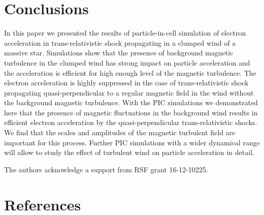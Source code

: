 \documentclass[a4paper]{jpconf}
\begin{document}
\section{Conclusions}
In this paper we presented the results of particle-in-cell simulation of electron acceleration in trans-relativistic shock propagating in a clumped  wind of a massive star. Simulations show that the presence  of background  magnetic turbulence in the clumped wind has strong impact on particle acceleration and the acceleration is efficient for high enough level of the magnetic turbulence. The electron acceleration is highly suppressed in the case of  trans-relativistic shock propagating quasi-perpendicular to a regular magnetic field in the wind without the background magnetic turbulence. With the PIC simulations we demonstrated here that the presence of magnetic fluctuations in the background wind results in efficient electron acceleration by the quasi-perpendicular trans-relativistic shocks. We find that the scales and amplitudes of the magnetic turbulent field are important for this process. Further PIC simulations with a wider dynamical range will allow to study the effect of turbulent wind on particle acceleration in detail.

\ack
The authors acknowledge a support from RSF grant 16-12-10225.



\section*{References}



\end{document}
